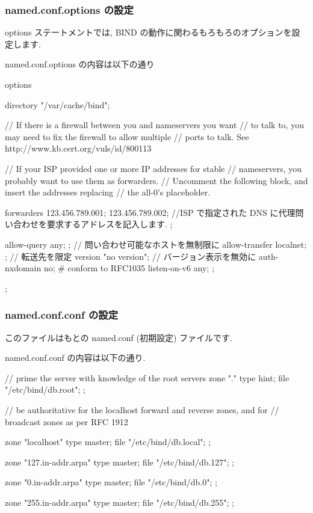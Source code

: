 \documentclass[mingoth,a4paper]{jsarticle}
\begin{document}
\subsubsection{named.conf.options の設定}
options ステートメントでは, BIND の動作に関わるもろもろのオプションを設定します.

named.conf.options の内容は以下の通り
\begin{commandline}
options {
	directory "/var/cache/bind";

	// If there is a firewall between you and nameservers you want
	// to talk to, you may need to fix the firewall to allow multiple
	// ports to talk.  See http://www.kb.cert.org/vuls/id/800113

	// If your ISP provided one or more IP addresses for stable 
	// nameservers, you probably want to use them as forwarders.  
	// Uncomment the following block, and insert the addresses replacing 
	// the all-0's placeholder.

	forwarders {
		123.456.789.001; 123.456.789.002;
            //ISP で指定された DNS に代理問い合わせを要求するアドレスを記入します.
	 };

	allow-query { any; };  // 問い合わせ可能なホストを無制限に
	allow-transfer { localnet; };  // 転送先を限定
	version "no version";  // バージョン表示を無効に
	auth-nxdomain no;    # conform to RFC1035
	listen-on-v6 { any; };

};
\end{commandline}

\subsubsection{named.conf.conf の設定}
このファイルはもとの named.conf (初期設定) ファイルです.

named.conf.conf の内容は以下の通り.
\begin{commandline}
// prime the server with knowledge of the root servers
zone "." {
	type hint;
	file "/etc/bind/db.root";
};

// be authoritative for the localhost forward and reverse zones, and for
// broadcast zones as per RFC 1912

zone "localhost" {
	type master;
	file "/etc/bind/db.local";
};

zone "127.in-addr.arpa" {
	type master;
	file "/etc/bind/db.127";
};

zone "0.in-addr.arpa" {
	type master;
	file "/etc/bind/db.0";
};

zone "255.in-addr.arpa" {
	type master;
	file "/etc/bind/db.255";
};
\end{commandline}
\end{document}
